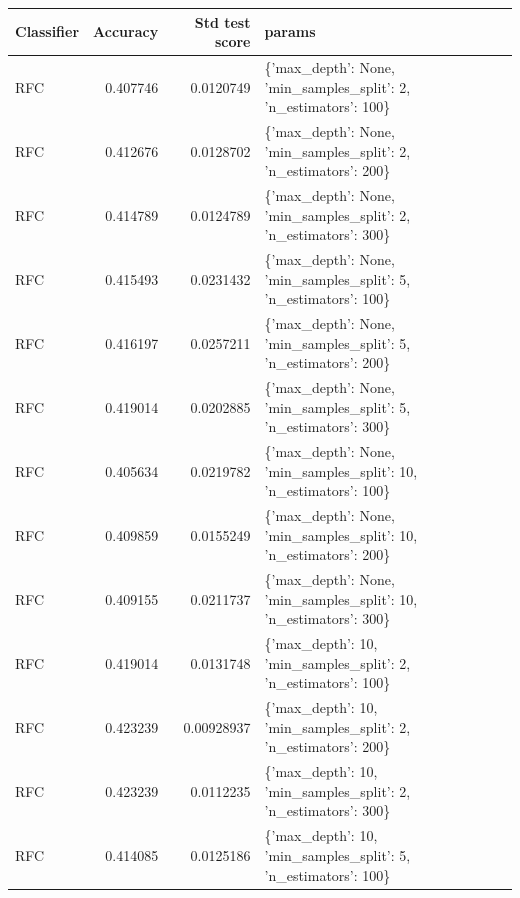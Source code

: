 \documentclass[conference,onecolumn]{IEEEtran}
\begin{document}
    \begin{table}[H]
        \begin{center}
        \begin{longtable}{lrrl}
            \hline
             Classifier   &   Accuracy &   Std test score & params                                                            \\
            \hline
             RFC          &   0.407746 &       0.0120749  & \{'max\_depth': None, 'min\_samples\_split': 2, 'n\_estimators': 100\}  \\
             RFC          &   0.412676 &       0.0128702  & \{'max\_depth': None, 'min\_samples\_split': 2, 'n\_estimators': 200\}  \\
             RFC          &   0.414789 &       0.0124789  & \{'max\_depth': None, 'min\_samples\_split': 2, 'n\_estimators': 300\}  \\
             RFC          &   0.415493 &       0.0231432  & \{'max\_depth': None, 'min\_samples\_split': 5, 'n\_estimators': 100\}  \\
             RFC          &   0.416197 &       0.0257211  & \{'max\_depth': None, 'min\_samples\_split': 5, 'n\_estimators': 200\}  \\
             RFC          &   0.419014 &       0.0202885  & \{'max\_depth': None, 'min\_samples\_split': 5, 'n\_estimators': 300\}  \\
             RFC          &   0.405634 &       0.0219782  & \{'max\_depth': None, 'min\_samples\_split': 10, 'n\_estimators': 100\} \\
             RFC          &   0.409859 &       0.0155249  & \{'max\_depth': None, 'min\_samples\_split': 10, 'n\_estimators': 200\} \\
             RFC          &   0.409155 &       0.0211737  & \{'max\_depth': None, 'min\_samples\_split': 10, 'n\_estimators': 300\} \\
             RFC          &   0.419014 &       0.0131748  & \{'max\_depth': 10, 'min\_samples\_split': 2, 'n\_estimators': 100\}    \\
             RFC          &   0.423239 &       0.00928937 & \{'max\_depth': 10, 'min\_samples\_split': 2, 'n\_estimators': 200\}    \\
             RFC          &   0.423239 &       0.0112235  & \{'max\_depth': 10, 'min\_samples\_split': 2, 'n\_estimators': 300\}    \\
             RFC          &   0.414085 &       0.0125186  & \{'max\_depth': 10, 'min\_samples\_split': 5, 'n\_estimators': 100\}    \\

\end{longtable}
\end{center}
\end{table}
\end{document}

